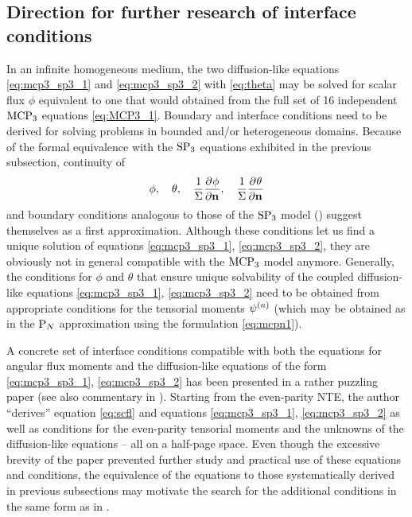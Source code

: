 \subsection{Direction for further research of interface conditions}\label{sec:mcp3_discussion}
In an infinite homogeneous medium, the two diffusion-like equations \eqref{eq:mcp3_sp3_1} and
\eqref{eq:mcp3_sp3_2} with \eqref{eq:theta} may be solved for scalar flux $\phi$ equivalent to one that would obtained from the full set
of 16 independent $\MCPN[3]$ equations \eqref{eq:MCP3_1}. Boundary and interface conditions need to be derived for
solving problems in bounded and/or heterogeneous domains. Because of the formal equivalence with the $\SPN[3]$
equations exhibited in the previous subsection, continuity of
$$
	\phi,\quad \theta,\quad \frac{1}{\Sigma}\pd{\phi}{\bn},\quad \frac{1}{\Sigma}\pd{\theta}{\bn}
$$
and boundary conditions analogous to those of the $\SPN[3]$ model () suggest themselves as a first
approximation. Although these conditions let us find a unique solution of equations \eqref{eq:mcp3_sp3_1},
\eqref{eq:mcp3_sp3_2}, they are obviously not in general compatible with the $\MCPN[3]$ model anymore. Generally, the
conditions for $\phi$ and $\theta$ that ensure unique solvability of the coupled diffusion-like equations
\eqref{eq:mcp3_sp3_1}, \eqref{eq:mcp3_sp3_2} need to be obtained from appropriate conditions for the tensorial moments
$\fmom[n]$ (which may be obtained as in the $\PN$ approximation using the formulation \eqref{eq:mcpn1}).

A concrete set of interface conditions compatible with both the equations for angular flux moments and the
diffusion-like equations of the form \eqref{eq:mcp3_sp3_1}, \eqref{eq:mcp3_sp3_2} has been presented in a rather
puzzling paper \cite{Selengut} (see also commentary in \cite[Sec. 5.2]{McClarren2}). Starting from the even-parity NTE,
the author ``derives'' equation \eqref{eq:scfl} and equations \eqref{eq:mcp3_sp3_1}, \eqref{eq:mcp3_sp3_2} as well as
conditions for the even-parity tensorial moments and the unknowns of the diffusion-like equations -- all on a half-page
space. Even though the excessive brevity of the paper prevented further study and practical use of these equations and
conditions, the equivalence of the equations to those systematically derived in previous subsections may motivate the
search for the additional conditions in the same form as in \cite{Selengut}.



